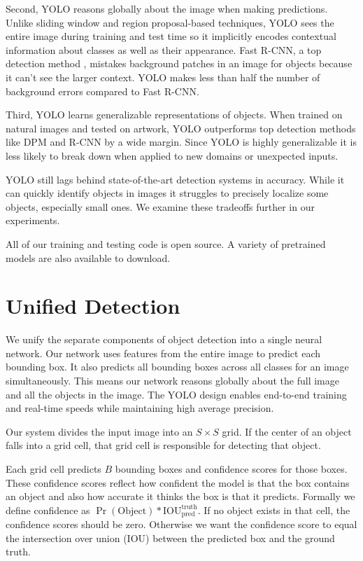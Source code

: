 Second, YOLO reasons globally about the image when making predictions. Unlike sliding window and region proposal-based techniques, YOLO sees the entire image during training and test time so it implicitly encodes contextual information about classes as well as their appearance. Fast R-CNN, a top detection method \cite{DBLP:journals/corr/Girshick15}, mistakes background patches in an image for objects because it can't see the larger context. YOLO makes less than half the number of background errors compared to Fast R-CNN.

Third, YOLO learns generalizable representations of objects. When trained on natural images and tested on artwork, YOLO outperforms top detection methods like DPM and R-CNN by a wide margin. Since YOLO is highly generalizable it is less likely to break down when applied to new domains or unexpected inputs.

YOLO still lags behind state-of-the-art detection systems in accuracy. While it can quickly identify objects in images it struggles to precisely localize some objects, especially small ones. We examine these tradeoffs further in our experiments.

All of our training and testing code is open source.
A variety of pretrained models are also available to download.

\section{Unified Detection}

We unify the separate components of object detection into a single neural network. Our network uses features from the entire image to predict each bounding box. It also predicts all bounding boxes across all classes for an image simultaneously. This means our network reasons globally about the full image and all the objects in the image. The YOLO design enables end-to-end training and real-time speeds while maintaining high average precision.

Our system divides the input image into an $S \times S$ grid. If the center of an object falls into a grid cell, that grid cell is responsible for detecting that object.

Each grid cell predicts $B$ bounding boxes and confidence scores for those boxes. These confidence scores reflect how confident the model is that the box contains an object and also how accurate it thinks the box is that it predicts. Formally we define confidence as $\Pr(\textrm{Object}) * \textrm{IOU}_{\textrm{pred}}^{\textrm{truth}}$. If no object exists in that cell, the confidence scores should be zero. Otherwise we want the confidence score to equal the intersection over union (IOU) between the predicted box and the ground truth.

